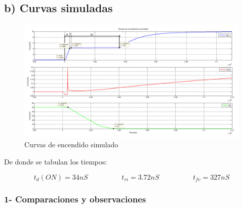 \documentclass[e4_tp1_main.tex]{subfiles}
\begin{document}
\newpage 
 
\subsection*{b) Curvas simuladas} 
 
\begin{figure}[H]
\centering
\includegraphics[width=1\linewidth]{Imagenes/Punto1/tiempo_encendidoX.png}
\caption{Curvas de encendido simulado}
\end{figure}

De donde se tabulan los tiempos:

\[
t_d(ON) = 34nS \hspace{2cm} t_{ri} = 3.72nS \hspace{2cm} t_{fv} = 327nS
\]

\subsubsection*{1- Comparaciones y observaciones}
\end{document}
